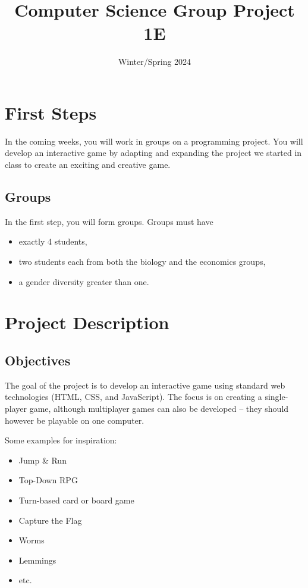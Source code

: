 \documentclass[11pt,a4paper]{report}
\title{Computer Science Group Project 1E}
\date{Winter/Spring 2024}
\begin{document}
\maketitle

\newpage

\section{First Steps}

In the coming weeks, you will work in groups on a programming project. You will develop an interactive game by adapting and expanding the project we started in class to create an exciting and creative game.

\subsection{Groups}

In the first step, you will form groups. Groups must have
\begin{itemize}
    \item exactly 4 students,
    \item two students each from both the biology and the economics groups,
    \item a gender diversity greater than one.
\end{itemize} 

\newpage

\section{Project Description}

\subsection{Objectives}

The goal of the project is to develop an interactive game using standard web technologies (HTML, CSS, and JavaScript). The focus is on creating a single-player game, although multiplayer games can also be developed -- they should however be playable on one computer.

Some examples for inspiration:
\begin{itemize}
\item Jump \& Run
\item Top-Down RPG
\item Turn-based card or board game
\item Capture the Flag
\item Worms
\item Lemmings
\item etc.
\end{itemize}
\end{document}
